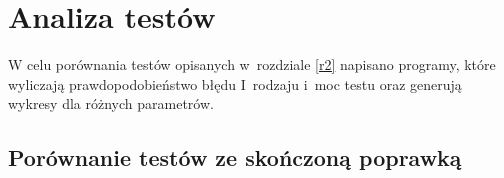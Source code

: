 \chapter{Analiza testów}
\label{r3}

W celu porównania testów opisanych w~rozdziale \ref{r2} napisano programy, które wyliczają prawdopodobieństwo błędu I~rodzaju i~moc testu oraz generują wykresy dla różnych parametrów.

\section{Porównanie testów ze skończoną poprawką}
\label{r3:skonczonetesty}

%
%
